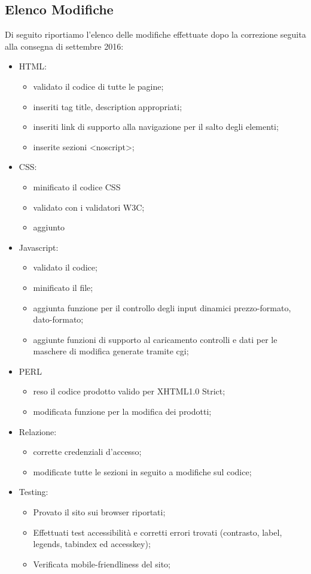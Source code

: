 \subsection{Elenco Modifiche}{
	Di seguito riportiamo l'elenco delle modifiche effettuate dopo la correzione seguita alla consegna di settembre 2016:
	\begin{itemize}\itemsep1pt
		\item HTML:
		\begin{itemize}\itemsep1pt
			\item validato il codice di tutte le pagine;
			\item inseriti tag title, description appropriati;
			\item inseriti link di supporto alla navigazione per il salto degli elementi;
			\item inserite sezioni <noscript>;
		\end{itemize}
		\item CSS:
		\begin{itemize}\itemsep1pt
			\item minificato il codice CSS
			\item validato con i validatori W3C;
			\item aggiunto 
		\end{itemize}
		\item Javascript:
		\begin{itemize}\itemsep1pt
			\item validato il codice;
			\item minificato il file;
			\item aggiunta funzione per il controllo degli input dinamici prezzo-formato, dato-formato;
			\item aggiunte funzioni di supporto al caricamento controlli e dati per le maschere di modifica generate tramite cgi;
		\end{itemize}
		\item PERL
		\begin{itemize}\itemsep1pt
			\item reso il codice prodotto valido per XHTML1.0 Strict;
			\item modificata funzione per la modifica dei prodotti;
		\end{itemize}
		\item Relazione: 
		\begin{itemize}\itemsep1pt
			\item corrette credenziali d'accesso;
			\item modificate tutte le sezioni in seguito a modifiche sul codice;
		\end{itemize}
		\item Testing:
		\begin{itemize}\itemsep1pt
			\item Provato il sito sui browser riportati;
			\item Effettuati test accessibilità e corretti errori trovati (contrasto, label, legends, tabindex ed accesskey);
			\item Verificata mobile-friendliness del sito;
		\end{itemize}
	\end{itemize}
}